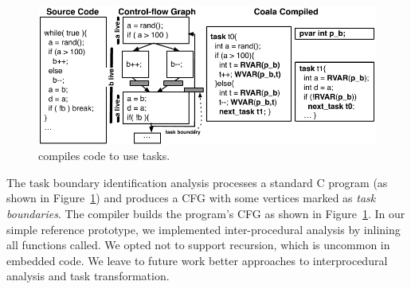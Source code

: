 %
%


\begin{figure}
	\centering
	\includegraphics[width=.85\columnwidth]{figures/compiler.pdf}
	\caption{\sys compiles code to use tasks.}
	\label{fig:compiler_overview}
\end{figure}

The task boundary identification analysis processes a standard C program (as
shown in Figure~\ref{fig:compiler_overview}) and produces a CFG with some
vertices marked as {\em task boundaries}. The \sys compiler builds the
program's CFG as shown in Figure~\ref{fig:compiler_overview}. In our simple
reference prototype, we implemented inter-procedural analysis by inlining all
functions called.  We opted not to support recursion, which is uncommon in
embedded code. We leave to future work better approaches to interprocedural
analysis and task transformation.
 

